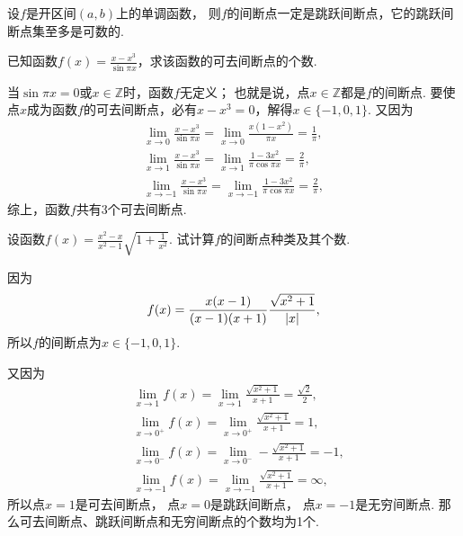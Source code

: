 \begin{theorem}
设\(f\)是开区间\((a,b)\)上的单调函数，
则\(f\)的间断点一定是跳跃间断点，它的跳跃间断点集至多是可数的.
\end{theorem}

\begin{example}
已知函数\(f(x) = \frac{x-x^3}{\sin \pi x}\)，求该函数的可去间断点的个数.
\begin{solution}
当\(\sin \pi x = 0\)或\(x \in \mathbb{Z}\)时，函数\(f\)无定义；
也就是说，点\(x\in\mathbb{Z}\)都是\(f\)的间断点.
要使点\(x\)成为函数\(f\)的可去间断点，必有\(x-x^3=0\)，解得\(x\in\{-1,0,1\}\).
又因为\begin{gather*}
	\lim_{x\to0} \frac{x-x^3}{\sin \pi x}
	= \lim_{x\to0} \frac{x(1-x^2)}{\pi x}
	= \frac1\pi, \\
	\lim_{x\to1} \frac{x-x^3}{\sin \pi x}
	= \lim_{x\to1} \frac{1-3x^2}{\pi \cos \pi x}
	= \frac2\pi, \\
	\lim_{x\to-1} \frac{x-x^3}{\sin \pi x}
	= \lim_{x\to-1} \frac{1-3x^2}{\pi \cos \pi x}
	= \frac2\pi,
\end{gather*}
综上，函数\(f\)共有3个可去间断点.
\end{solution}
\end{example}

\begin{example}
设函数\(f(x) = \frac{x^2-x}{x^2-1}\sqrt{1+\frac{1}{x^2}}\).
试计算\(f\)的间断点种类及其个数.
\begin{solution}
因为\begin{equation*}
	f(x) = \frac{x(x-1)}{(x-1)(x+1)} \frac{\sqrt{x^2+1}}{\abs{x}},
\end{equation*}
所以\(f\)的间断点为\(x\in\{-1,0,1\}\).

又因为\begin{align*}
	&\lim_{x\to1} f(x)
	= \lim_{x\to1} \frac{\sqrt{x^2+1}}{x+1}
	= \frac{\sqrt{2}}{2}, \\
	&\lim_{x\to0^+} f(x)
	= \lim_{x\to0^+} \frac{\sqrt{x^2+1}}{x+1}
	= 1, \\
	&\lim_{x\to0^-} f(x)
	= \lim_{x\to0^-} -\frac{\sqrt{x^2+1}}{x+1}
	= -1, \\
	&\lim_{x\to-1} f(x)
	= \lim_{x\to-1} \frac{\sqrt{x^2+1}}{x+1}
	= \infty,
\end{align*}
所以点\(x=1\)是可去间断点，
点\(x=0\)是跳跃间断点，
点\(x=-1\)是无穷间断点.
那么可去间断点、跳跃间断点和无穷间断点的个数均为1个.
\end{solution}
\end{example}

